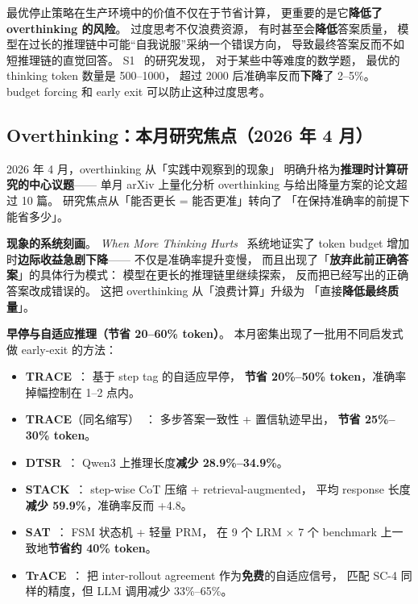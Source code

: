 最优停止策略在生产环境中的价值不仅在于节省计算，
更重要的是它\textbf{降低了 overthinking 的风险}。
过度思考不仅浪费资源，
有时甚至会\textbf{降低}答案质量，
模型在过长的推理链中可能“自我说服”采纳一个错误方向，
导致最终答案反而不如短推理链的直觉回答。
S1~\cite{muennighoff2025s1} 的研究发现，
对于某些中等难度的数学题，
最优的 thinking token 数量是 500--1000，
超过 2000 后准确率反而\textbf{下降}了 2--5\%。
budget forcing 和 early exit 可以防止这种过度思考。

\subsection{Overthinking：本月研究焦点（2026 年 4 月）}
\label{sec:overthinking-focus}

2026 年 4 月，overthinking 从「实践中观察到的现象」
明确升格为\textbf{推理时计算研究的中心议题}——
单月 arXiv 上量化分析 overthinking 与给出降量方案的论文超过 10 篇。
研究焦点从「能否更长 = 能否更准」转向了
「在保持准确率的前提下能省多少」。

\textbf{现象的系统刻画}。
\textit{When More Thinking Hurts}~\cite{whenmorehurts2026}
系统地证实了 token budget 增加时\textbf{边际收益急剧下降}——
不仅是准确率提升变慢，
而且出现了「\textbf{放弃此前正确答案}」的具体行为模式：
模型在更长的推理链里继续探索，
反而把已经写出的正确答案改成错误的。
这把 overthinking 从「浪费计算」升级为
「直接\textbf{降低最终质量}」。

\textbf{早停与自适应推理（节省 20--60\% token）}。
本月密集出现了一批用不同启发式做 early-exit 的方法：

\begin{itemize}[noitemsep]
  \item \textbf{TRACE}~\cite{trace_steptag2026}：
        基于 step tag 的自适应早停，
        \textbf{节省 20\%--50\% token}，准确率掉幅控制在 1--2 点内。
  \item \textbf{TRACE}（同名缩写）~\cite{trace_consistency2026}：
        多步答案一致性 + 置信轨迹早出，
        \textbf{节省 25\%--30\% token}。
  \item \textbf{DTSR}~\cite{dtsr2026}：
        Qwen3 上推理长度\textbf{减少 28.9\%--34.9\%}。
  \item \textbf{STACK}~\cite{stack2026}：
        step-wise CoT 压缩 + retrieval-augmented，
        平均 response 长度\textbf{减少 59.9\%}，准确率反而 +4.8。
  \item \textbf{SAT}~\cite{sat2026}：
        FSM 状态机 + 轻量 PRM，
        在 9 个 LRM × 7 个 benchmark 上一致地\textbf{节省约 40\% token}。
  \item \textbf{TrACE}~\cite{trace_interrollout2026}：
        把 inter-rollout agreement 作为\textbf{免费}的自适应信号，
        匹配 SC-4 同样的精度，但 LLM 调用减少 33\%--65\%。
\end{itemize}


